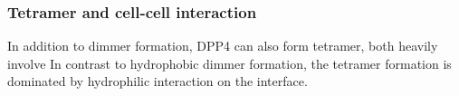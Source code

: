 \subsubsection{Tetramer and cell-cell interaction}

In addition to dimmer formation, DPP4 can also form tetramer, both heavily involve  In contrast to hydrophobic dimmer formation, the tetramer formation is dominated by hydrophilic interaction on the interface.~\cite{Engel_2003} 